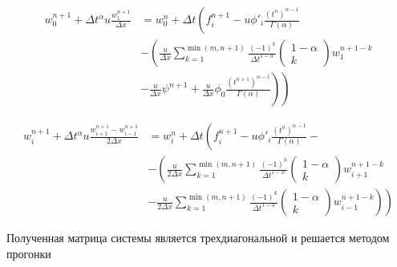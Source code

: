 
\begin{equation}
	\begin{split}
		w_0^{n+1} + \Delta t^{\alpha} u \frac{w_{1}^{n+1}}{\Delta x}
		&= w_0^{n} + \Delta t
		\left(
			f_i^{n+1} - u \phi'_{i}\frac{\left(t^n\right)^{\alpha - 1}}{\Gamma(\alpha)}
		\right.\\
		&\left. -
			\left(
				\frac{u}{\Delta x}
				\sum_{k=1}^{\min (m,n+1)}
				\frac{(-1)^k}{\Delta t^{1-\alpha}} \begin{pmatrix} 1 - \alpha \\ k \end{pmatrix}
				w^{n+1-k}_{1}
			\right.
		\right.\\
		&\left.
			\left.
				- \frac{u}{\Delta x}\psi^{n+1} + \frac{u}{\Delta x}\phi_0
				\frac{\left(t^{n+1}\right)^{\alpha - 1}}{\Gamma(\alpha)}
			\right)
		\right)
	\end{split}
\end{equation}

\begin{equation}
	\begin{split}
		w_i^{n+1} + \Delta t^{\alpha} u \frac{w_{i+1}^{n+1} - w_{i-1}^{n+1}}{2 \Delta x}
		&= w_i^{n} + \Delta t
		\left(
			f_i^{n+1} - u \phi'_{i}\frac{\left(t^n\right)^{\alpha - 1}}{\Gamma(\alpha)}
		\right.-\\
		&-\left.
			\left(
				\frac{u}{2 \Delta x}
				\sum_{k=1}^{\min (m,n+1)}
				\frac{(-1)^k}{\Delta t^{1-\alpha}}
				\begin{pmatrix} 1 - \alpha \\ k \end{pmatrix}
				w^{n+1-k}_{i+1}
			\right.
		\right.\\
		&\left.
			\left.
				- \frac{u}{2 \Delta x}
				\sum_{k=1}^{\min (m,n+1)}
				\frac{(-1)^k}{\Delta t^{1-\alpha}}
				\begin{pmatrix} 1 - \alpha \\ k \end{pmatrix}
				w^{n+1-k}_{i-1}
			\right)
		\right)
	\end{split}
\end{equation}
 
Полученная матрица системы является трехдиагональной и решается методом прогонки

